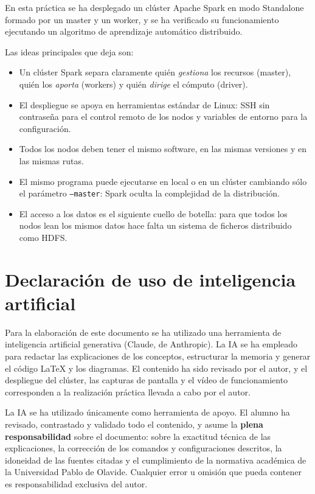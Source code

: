 \documentclass[11pt,a4paper]{article}
\begin{document}
En esta práctica se ha desplegado un clúster Apache Spark en modo Standalone formado por un master y un worker, y se ha verificado su funcionamiento ejecutando un algoritmo de aprendizaje automático distribuido.

Las ideas principales que deja son:
\begin{itemize}
  \item Un clúster Spark separa claramente quién \emph{gestiona} los recursos (master), quién los \emph{aporta} (workers) y quién \emph{dirige} el cómputo (driver).
  \item El despliegue se apoya en herramientas estándar de Linux: SSH sin contraseña para el control remoto de los nodos y variables de entorno para la configuración.
  \item Todos los nodos deben tener el mismo software, en las mismas versiones y en las mismas rutas.
  \item El mismo programa puede ejecutarse en local o en un clúster cambiando sólo el parámetro \texttt{--master}: Spark oculta la complejidad de la distribución.
  \item El acceso a los datos es el siguiente cuello de botella: para que todos los nodos lean los mismos datos hace falta un sistema de ficheros distribuido como HDFS.
\end{itemize}

\section*{Declaración de uso de inteligencia artificial}

Para la elaboración de este documento se ha utilizado una herramienta de inteligencia artificial generativa (Claude, de Anthropic). La IA se ha empleado para redactar las explicaciones de los conceptos, estructurar la memoria y generar el código \LaTeX{} y los diagramas. El contenido ha sido revisado por el autor, y el despliegue del clúster, las capturas de pantalla y el vídeo de funcionamiento corresponden a la realización práctica llevada a cabo por el autor.

La IA se ha utilizado únicamente como herramienta de apoyo. El alumno ha revisado, contrastado y validado todo el contenido, y asume la \textbf{plena responsabilidad} sobre el documento: sobre la exactitud técnica de las explicaciones, la corrección de los comandos y configuraciones descritos, la idoneidad de las fuentes citadas y el cumplimiento de la normativa académica de la Universidad Pablo de Olavide. Cualquier error u omisión que pueda contener es responsabilidad exclusiva del autor.

\clearpage
{}
{}


\end{document}
